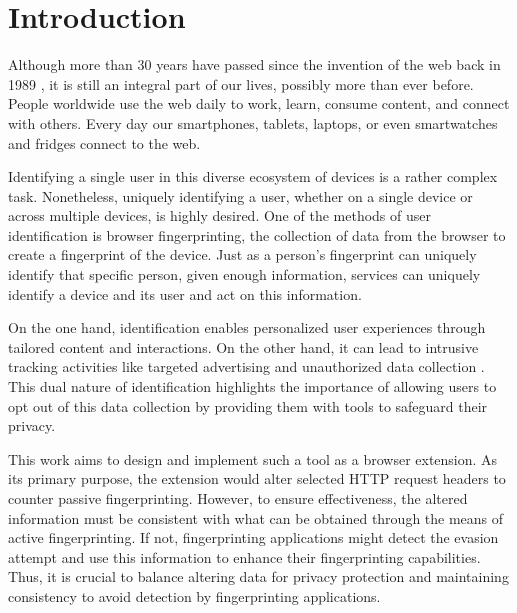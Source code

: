 
% 


\chapter{Introduction}

Although more than 30 years have passed since the invention of the web back in 1989 \cite{WWWProposal}, it is still an integral part of our lives, possibly more than ever before. People worldwide use the web daily to work, learn, consume content, and connect with others. Every day our smartphones, tablets, laptops, or even smartwatches and fridges connect to the web.

Identifying a single user in this diverse ecosystem of devices is a rather complex task. Nonetheless, uniquely identifying a user, whether on a single device or across multiple devices, is highly desired. One of the methods of user identification is browser fingerprinting, the collection of data from the browser to create a fingerprint of the device. Just as a person's fingerprint can uniquely identify that specific person, given enough information, services can uniquely identify a device and its user and act on this information.

On the one hand, identification enables personalized user experiences through tailored content and interactions. On the other hand, it can lead to intrusive tracking activities like targeted advertising and unauthorized data collection \cite{WP224Fingerprinting}. This dual nature of identification highlights the importance of allowing users to opt out of this data collection by providing them with tools to safeguard their privacy.

This work aims to design and implement such a tool as a browser extension. As its primary purpose, the extension would alter selected HTTP request headers to counter passive fingerprinting. However, to ensure effectiveness, the altered information must be consistent with what can be obtained through the means of active fingerprinting. If not, fingerprinting applications might detect the evasion attempt and use this information to enhance their fingerprinting capabilities. Thus, it is crucial to balance altering data for privacy protection and maintaining consistency to avoid detection by fingerprinting applications.

